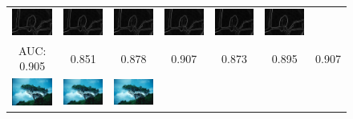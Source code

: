 \documentclass[10pt,twocolumn,letterpaper]{article}
\begin{document}
\begin{figure} [tb]
\begin{tabular*}{0.5\textwidth}{ccccccc}
  \includegraphics[width=2cm]{fig/42049[2-Bicubic]_crisp.jpg} & \hspace{-4mm}
  \includegraphics[width=2cm]{fig/42049[3-Zeyde]_crisp.jpg} & \hspace{-4mm}
  \includegraphics[width=2cm]{fig/42049[4-ANR]_crisp.jpg} & \hspace{-4mm}
  \includegraphics[width=2cm]{fig/42049[5-SRCNN]_crisp.jpg} & \hspace{-4mm}
  \includegraphics[width=2cm]{fig/42049[6-A+]_crisp.jpg} & \hspace{-4mm}
  \includegraphics[width=2cm]{fig/42049[7-JOR]_crisp.jpg} \\
  AUC: 0.905 & 0.851 & 0.878 & 0.907 & 0.873 & 0.895 & 0.907 \\ 
  \hspace{-2mm}
  \includegraphics[width=2cm]{fig/147091_g.jpg} & \hspace{-4mm}
  \includegraphics[width=2cm]{fig/147091[2-Bicubic]_g.jpg} & \hspace{-4mm}
  \includegraphics[width=2cm]{fig/147091[3-Zeyde]_g.jpg} & \hspace{-4mm}

\end{tabular*}
\end{figure}
\end{document}
